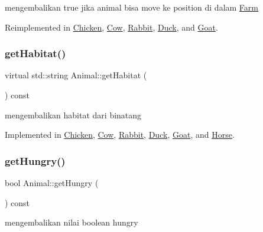 mengembalikan true jika animal bisa move ke position di dalam \mbox{\hyperlink{class_farm}{Farm}} 

Reimplemented in \mbox{\hyperlink{class_chicken_acfb2980acf752d7004675083b9475c28}{Chicken}}, \mbox{\hyperlink{class_cow_a3fc59f29ac63abeacde61165ff1faf2a}{Cow}}, \mbox{\hyperlink{class_rabbit_aedf048f173d55caa45576081f93dc931}{Rabbit}}, \mbox{\hyperlink{class_duck_a5b53ac1fbe028859bdc0149e6eeeef64}{Duck}}, and \mbox{\hyperlink{class_goat_a8c5441c13be5956b4d8381383a2783bb}{Goat}}.

\mbox{\label{class_animal_a3de687fb42b792132a09176c4a0e2125}} 
\subsubsection{\texorpdfstring{getHabitat()}{getHabitat()}}
{\footnotesize\ttfamily virtual std\+::string Animal\+::get\+Habitat (\begin{DoxyParamCaption}{ }\end{DoxyParamCaption}) const\hspace{0.3cm}{\ttfamily [pure virtual]}}

mengembalikan habitat dari binatang 

Implemented in \mbox{\hyperlink{class_chicken_a04caa14a1505440f93e6c81a387c6f27}{Chicken}}, \mbox{\hyperlink{class_cow_a16572694f707fef1a15767c7e219e64c}{Cow}}, \mbox{\hyperlink{class_rabbit_a2bb761dcc6979ff6db93d253fbe7a3b0}{Rabbit}}, \mbox{\hyperlink{class_duck_ada6104f405921dc1aaf38a7df72a8465}{Duck}}, \mbox{\hyperlink{class_goat_a10f7555af9962fa54783f288cbf47d95}{Goat}}, and \mbox{\hyperlink{class_horse_af1b6722e6b3f0d206087c9f87a01f548}{Horse}}.

\mbox{\label{class_animal_ac45667055a4d3fc254f32faffbc3c5ca}} 
\subsubsection{\texorpdfstring{getHungry()}{getHungry()}}
{\footnotesize\ttfamily bool Animal\+::get\+Hungry (\begin{DoxyParamCaption}{ }\end{DoxyParamCaption}) const}

mengembalikan nilai boolean hungry \mbox{\label{class_animal_ae5e867305b95d2faa30ea1182a5bbc32}} 
